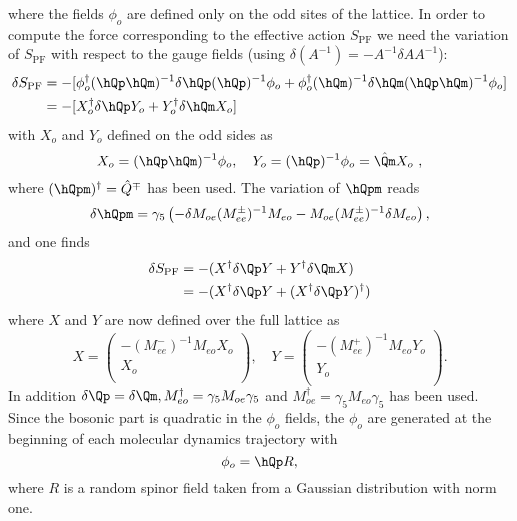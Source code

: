 where the fields $\phi_o$ are defined only on the odd sites of the
lattice. In order to compute the force corresponding to the effective
action $S_\mathrm{PF}$ we need the variation of $S_\mathrm{PF}$ with respect to the gauge fields
(using $\delta (A^{-1})=-A^{-1}\delta A A^{-1}$):
\begin{equation}
  \label{eq:eo5}
  \begin{split}
    \delta S_\mathrm{PF} &= -[\phi_o^\dagger (\hQp \hQm)^{-1}\delta \hQp(\hQp)^{-1}\phi_o +
    \phi_o^\dagger(\hQm)^{-1}\delta \hQm (\hQp \hQm)^{-1} \phi_o ] \\
     &= -[X_o^\dagger \delta \hQp Y_o + Y_o^\dagger \delta\hQm X_o]
  \end{split}
\end{equation}
with $X_o$ and $Y_o$ defined on the odd sides as 
\begin{equation}
  \label{eq:eo6}
  X_o = (\hQp \hQm)^{-1} \phi_o,\quad Y_o = (\hQp)^{-1}\phi_o=\hat
  \Qm X_o\ ,
\end{equation}
where $(\hQpm)^\dagger = \hat Q^\mp$ has been used. The variation of
$\hQpm$ reads
\begin{equation}
  \label{eq:eo7}
  \delta \hQpm = \gamma_5\left(-\delta M_{oe}(M_{ee}^\pm )^{-1}M_{eo} -
    M_{oe}(M_{ee}^\pm )^{-1}\delta M_{eo}\right),
\end{equation}
and one finds
\begin{equation}
  \label{eq:eo8}
  \begin{split}
    \delta S_\mathrm{PF} &= -(X^\dagger\delta \Qp Y + Y^\dagger\delta \Qm X) \\
    &= -(X^\dagger\delta \Qp Y +(X^\dagger\delta \Qp Y)^\dagger)
  \end{split}
\end{equation}
where $X$ and $Y$ are now defined over the full lattice as
\begin{equation}
  \label{eq:eo9}
  X = 
  \begin{pmatrix}
    -(M_{ee}^-)^{-1}M_{eo}X_o \\ X_o\\
  \end{pmatrix},\quad
  Y = 
  \begin{pmatrix}
    -(M_{ee}^+)^{-1}M_{eo}Y_o \\ Y_o\\
  \end{pmatrix}.
\end{equation}
In addition $\delta\Qp = \delta\Qm, M_{eo}^\dagger = \gamma_5 M_{oe}\gamma_5$ and
$M_{oe}^\dagger = \gamma_5 M_{eo}\gamma_5$ has been used. Since the bosonic part
is quadratic in the $\phi_o$ fields, the $\phi_o$ are generated at the
beginning of each molecular dynamics trajectory with
\begin{equation}
  \label{eq:eo10}
  \phi_o = \hQp R,
\end{equation}
where $R$ is a random spinor field taken from a Gaussian distribution
with norm one.

